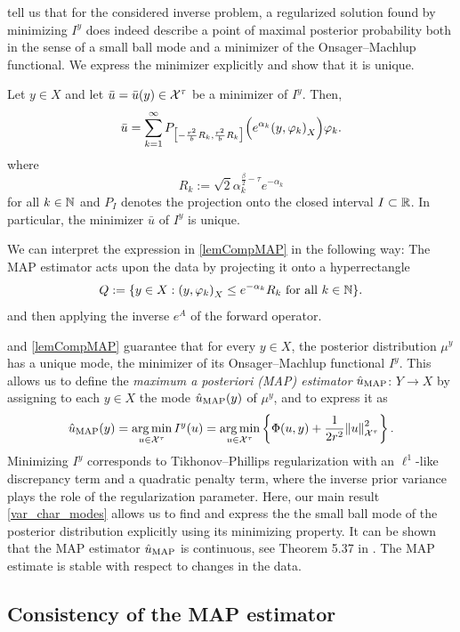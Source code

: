 \documentclass[english]{jnsao}
\theoremstyle{definition}
\begin{document}
 tell us that for the considered inverse problem, a regularized solution found by minimizing $I^y$ does indeed describe a point of maximal posterior probability both in the sense of a small ball mode and a minimizer of the Onsager--Machlup functional.
We express the minimizer explicitly and show that it is unique.
\begin{lemma} 
	\label{lemCompMAP}
	Let $y \in X$ and let $\bar{u} = \bar{u}(y) \in {\mathcal{X}^{\tau}}$ be a minimizer of $I^y$.
	Then,
	\begin{equation*}
		\bar{u} = \sum_{k=1}^\infty P_{\big[-\frac{r^2}{b}R_k,\frac{r^2}{b}R_k\big]} \Big(e^{\alpha_k}{(y,\varphi_k)}_X\Big) \varphi_k.
	\end{equation*}
	where
	\[ R_k := \sqrt{2}\alpha_k^{\frac{\beta}{2} - \tau}e^{-\alpha_k} \]
	for all $k \in \mathbb{N}$ and $P_I$ denotes the projection onto the closed interval $I \subset {\mathbb{R}}$.
	In particular, the minimizer $\bar u$ of $I^y$ is unique.
\end{lemma}
We can interpret the expression in \cref{lemCompMAP} in the following way: The MAP estimator acts upon the data by projecting it onto a hyperrectangle 
	\[ Q := \{ y \in X: {(y, \varphi_k)}_X \le e^{-\alpha_k}R_k \text{ for all }k \in \mathbb{N} \}. \]
and then applying the inverse $e^A$ of the forward operator.

 and \cref{lemCompMAP} guarantee that for every $y \in X$, the posterior distribution $\mu^y$ has a unique mode, the minimizer of its Onsager--Machlup functional $I^y$. This allows us to define the \emph{maximum a posteriori (MAP) estimator} $\hat{u}_\mathrm{MAP}$: $Y \to X$ by assigning to each $y \in X$ the mode $\hat{u}_\mathrm{MAP}(y)$ of $\mu^y$, and to express it as
\[ \hat{u}_\mathrm{MAP}(y) = \operatorname*{arg\,min}_{u \in {\mathcal{X}^{\tau}}} I^y(u) = \operatorname*{arg\,min}_{u \in {\mathcal{X}^{\tau}}} \left\{ \Phi(u,y) + \frac{1}{2r^2}{\lVert u\rVert}_{\mathcal{X}^{\tau}}^2 \right\}. \]
Minimizing $I^y$ corresponds to Tikhonov--Phillips regularization with an $\ell^1$-like discrepancy term and a quadratic penalty term, where the inverse prior variance plays the role of the regularization parameter.
Here, our main result \cref{var_char_modes} allows us to find and express the the small ball mode of the posterior distribution explicitly using its minimizing property.
It can be shown that the MAP estimator $\hat{u}_\mathrm{MAP}$ is continuous, see Theorem 5.37 in \cite{Kretschmann:2019}. The MAP estimate is stable with respect to changes in the data.

\subsection{Consistency of the MAP estimator}
\end{document}
